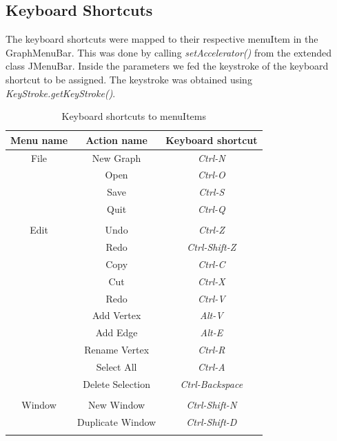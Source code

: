 \documentclass[a4paper]{article}
\begin{document}
\subsection{Keyboard Shortcuts} \label{section: Keyboard Shortcuts} 
\par The keyboard shortcuts were mapped to their respective menuItem in the GraphMenuBar. This was done by calling \textit{setAccelerator()} from the extended class JMenuBar. Inside the parameters we fed the keystroke of the keyboard shortcut to be assigned. The keystroke was obtained using \textit{KeyStroke.getKeyStroke()}. 
\begin{table}[h!]
    \centering
    \begin{tabular}{c|c||c}
         \hline
         Menu name & Action name & Keyboard shortcut\\
         \hline
         File & New Graph & \footnotesize\textit{Ctrl-N}\\
         & Open & \footnotesize\textit{Ctrl-O}\\
         & Save & \footnotesize\textit{Ctrl-S}\\
         & Quit & \footnotesize\textit{Ctrl-Q}\\
         & & \\
         \hline
         Edit & Undo & \footnotesize\textit{Ctrl-Z}\\
         & Redo & \footnotesize\textit{Ctrl-Shift-Z}\\
         & Copy & \footnotesize\textit{Ctrl-C}\\
         & Cut & \footnotesize\textit{Ctrl-X}\\
         & Redo & \footnotesize\textit{Ctrl-V}\\
         & Add Vertex & \footnotesize\textit{Alt-V}\\
         & Add Edge & \footnotesize\textit{Alt-E}\\
         & Rename Vertex & \footnotesize\textit{Ctrl-R}\\
         & Select All & \footnotesize\textit{Ctrl-A}\\
         & Delete Selection & \footnotesize\textit{Ctrl-Backspace}\\
         & & \\
         \hline
         Window & New Window & \footnotesize\textit{Ctrl-Shift-N}\\
         & Duplicate Window & \footnotesize\textit{Ctrl-Shift-D}\\
         & & \\
    \end{tabular}
    \caption{Keyboard shortcuts to menuItems}
    \label{tab: Keyboard Shortcuts}
\end{table}
\end{document}
